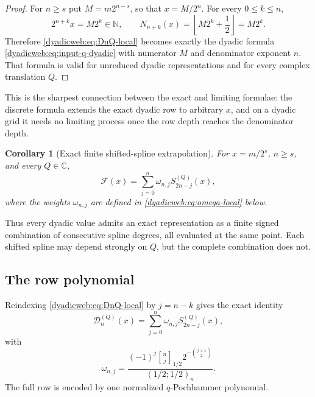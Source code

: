\documentclass[11pt,oneside]{article}
\newtheorem{corollary}[theorem]{Corollary}
\theoremstyle{definition}
\theoremstyle{remark}
\newcommand{\C}{\mathbb C}
\newcommand{\N}{\mathbb N}
\newcommand{\qbinom}[3]{\genfrac{[}{]}{0pt}{}{#1}{#2}_{#3}}
\begin{document}
\begin{proof}
For $n\ge s$ put $M=m2^{n-s}$, so that $x=M/2^n$.  For every $0\le k\le n$,
\[
 2^{n+k}x=M2^k\in\N,
 \qquad
 N_{n+k}(x)=\left\lfloor M2^k+\frac12\right\rfloor=M2^k.
\]
Therefore \eqref{dyadicweb:eq:DnQ-local} becomes exactly the dyadic formula
\eqref{dyadicweb:eq:input-q-dyadic} with numerator $M$ and denominator exponent $n$.  That formula is
valid for unreduced dyadic representations and for every complex translation $Q$.
\end{proof}

This is the sharpest connection between the exact and limiting formulae: the discrete formula
extends the exact dyadic row to arbitrary $x$, and on a dyadic grid it needs no limiting
process once the row depth reaches the denominator depth.

\begin{corollary}[Exact finite shifted-spline extrapolation]
\label{dyadicweb:cor:exact-shifted-extrapolation}
For $x=m/2^s$, $n\ge s$, and every $Q\in\C$,
\begin{equation}
 \mathcal F(x)=\sum_{j=0}^{n}\omega_{n,j}
 S_{2n-j}^{(Q)}(x),                                       \label{dyadicweb:eq:exact-shifted-extrapolation}
\end{equation}
where the weights $\omega_{n,j}$ are defined in
\eqref{dyadicweb:eq:omega-local} below.
\end{corollary}

Thus every dyadic value admits an exact representation as a finite signed combination of
consecutive spline degrees, all evaluated at the same point.  Each shifted spline may depend
strongly on $Q$, but the complete combination does not.

\subsection{The row polynomial}

Reindexing \eqref{dyadicweb:eq:DnQ-local} by $j=n-k$ gives the exact identity
\begin{equation}
 \mathcal D_n^{(Q)}(x)=
 \sum_{j=0}^{n}\omega_{n,j}S_{2n-j}^{(Q)}(x),              \label{dyadicweb:eq:D-toeplitz-local}
\end{equation}
with
\begin{equation}
 \omega_{n,j}=
 \frac{(-1)^j\qbinom nj{1/2}2^{-\binom{j+1}{2}}}
 {(1/2;1/2)_n}.                                           \label{dyadicweb:eq:omega-local}
\end{equation}
The full row is encoded by one normalized $q$-Pochhammer polynomial.
\end{document}
